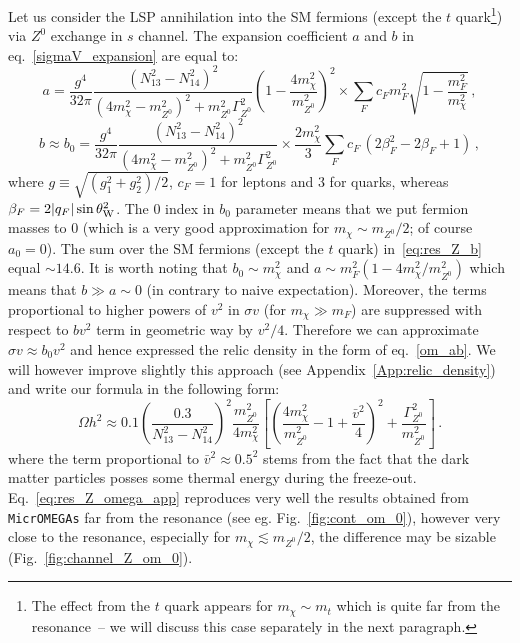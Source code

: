 \documentclass[12pt,twoside]{article}
\begin{document}
Let us consider the LSP annihilation into the SM fermions (except the $t$ quark\footnote{The effect from the $t$ quark appears for $m_{\chi}\sim m_t$ which is quite far from the resonance~-- we will discuss this case separately in the next paragraph.})
via $Z^0$ exchange in $s$ channel. The expansion coefficient $a$ and $b$ in eq.~\eqref{sigmaV_expansion} are equal to:
\begin{equation}
\label{eq:res_Z_a}
a=\frac{g^4}{32\pi}\frac{(N_{13}^2-N_{14}^2)^2}{(4m_{\chi}^2-m_{Z^0}^2)^2+m_{Z^0}^2\Gamma_{Z^0}^2}
\left(1-\frac{4m_\chi^2}{m_{Z^0}^2}\right)^2
\times 
\sum_Fc_Fm_F^2\sqrt{1-\frac{m_F^2}{m_{\chi}^2}}\,,
\end{equation}
%
\begin{equation}
\label{eq:res_Z_b}
b\approx b_0=\frac{g^4}{32\pi}\frac{(N_{13}^2-N_{14}^2)^2}{(4m_{\chi}^2-m_{Z^0}^2)^2+m_{Z^0}^2\Gamma_{Z^0}^2}\times 
\frac{2m_{\chi}^2}{3}\sum_F c_F\,(2\beta_F^2-2\beta_F+1)\,,
\end{equation}
%
where $g\equiv\sqrt{(g_1^2+g_2^2)/2}$, $c_F=1$ for leptons and 3 for quarks, whereas $\beta_F=2|q_F|\sin\theta_{\rm W}^2$. The 0 index in $b_0$ parameter means that we put fermion masses to 0 (which is a very good approximation for $m_\chi\sim m_{Z^0}/2$; of course $a_0=0$). The sum over the SM fermions (except the $t$ quark) in~\eqref{eq:res_Z_b} equal $\sim 14.6$. It is worth noting that $b_0\sim m_{\chi}^2$ and $a\sim m_F^2(1-4m_\chi^2/m^2_{Z^0})$ which means that $b\gg a\sim 0$ (in contrary to naive expectation). Moreover, the terms proportional to higher powers of $v^2$ in $\sigma v$  (for $m_\chi\gg m_F$) are suppressed with respect to $bv^2$ term in geometric way by $v^2/4$. Therefore we can approximate $\sigma v\approx b_0v^2$ and hence expressed the relic density in the form of eq.~\eqref{om_ab}. We will however improve slightly this approach (see Appendix~\ref{App:relic_density}) and write our formula in the following form:
%
\begin{equation}
\label{eq:res_Z_omega_app}
\Omega h^2\approx 0.1\left(\frac{0.3}{N_{13}^2-N_{14}^2}\right)^2
\frac{m_{Z^0}^2}{4m_{\chi}^2}
\left[\left(\frac{4m_{\chi}^2}{m_{Z^0}^2}-1 +\frac{\bar{v}^2}{4}\right)^2+
\frac{\Gamma_{Z^0}^2}{m_{Z^0}^2}\right]\,.
\end{equation}
%
where the term proportional to $\bar{v}^2\approx 0.5^2$ stems from the fact that the dark matter particles posses some thermal energy during the
freeze-out. Eq.~\eqref{eq:res_Z_omega_app} reproduces very well the results obtained from \texttt{MicrOMEGAs} far from the resonance (see eg.
Fig.~\ref{fig:cont_om_0}), however very close to the resonance, especially for $m_\chi\lesssim m_{Z^0}/2$, the difference may be sizable
(Fig.~\ref{fig:channel_Z_om_0}). 
\end{document}

